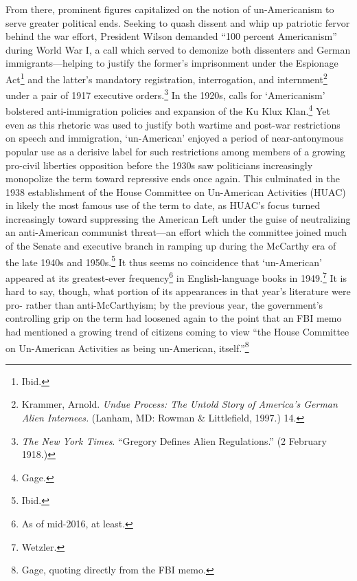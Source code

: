 From there, prominent figures capitalized on the notion of
un-Americanism to serve greater political ends. Seeking to quash dissent
and whip up patriotic fervor behind the war effort, President Wilson
demanded ``100 percent Americanism'' during World War I, a call which
served to demonize both dissenters and German immigrants---helping to
justify the former's imprisonment under the Espionage Act\footnote{Ibid.}
and the latter's mandatory registration, interrogation, and
internment\footnote{Krammer, Arnold. \emph{Undue Process: The Untold
  Story of America's German Alien Internees.} (Lanham, MD: Rowman \&
  Littlefield, 1997.) 14.} under a pair of 1917 executive
orders.\footnote{\textit{The New York Times}. ``Gregory Defines Alien
  Regulations.'' (2 February 1918.)}
In the 1920s, calls for `Americanism' bolstered anti-immigration
policies and expansion of the Ku Klux Klan.\footnote{Gage.} Yet even as
this rhetoric was used to justify both wartime and post-war restrictions
on speech and immigration, `un-American' enjoyed a period of
near-antonymous popular use as a derisive label for such restrictions
among members of a growing pro-civil liberties opposition before the
1930s saw politicians increasingly monopolize the term toward repressive
ends once again. This culminated in the 1938 establishment of the House
Committee on Un-American Activities (HUAC) in likely the most famous use
of the term to date, as HUAC's focus turned increasingly toward
suppressing the American Left under the guise of neutralizing an
anti-American communist threat---an effort which the committee joined
much of the Senate and executive branch in ramping up during the
McCarthy era of the late 1940s and 1950s.\footnote{Ibid.} It thus seems
no coincidence that `un-American' appeared at its greatest-ever
frequency\footnote{As of mid-2016, at least.} in English-language books
in 1949.\footnote{Wetzler.} It is hard to say, though, what portion of
its appearances in that year's literature were pro- rather than
anti-McCarthyism; by the previous year, the government's controlling
grip on the term had loosened again to the point that an FBI memo had
mentioned a growing trend of citizens coming to view ``the House
Committee on Un-American Activities as being un-American,
itself.''\footnote{Gage, quoting directly from the FBI memo.}

